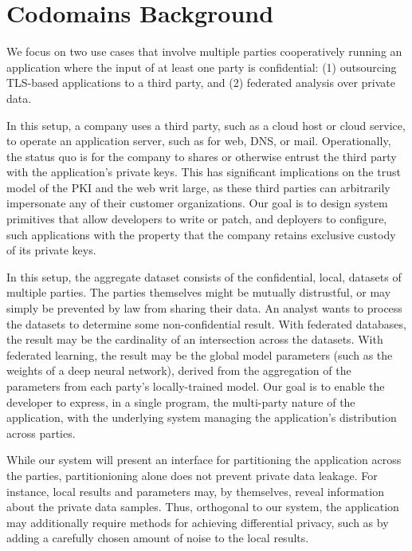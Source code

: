 \section{Codomains Background}
\label{sec:codomains-background}

We focus on two use cases that involve multiple parties cooperatively running
an application where the input of at least one party is confidential:
(1) outsourcing TLS-based applications to a third party, and (2) federated
analysis over private data.


%
In this setup, a company uses a third party, such as a cloud host or cloud
service, to operate an application server, such as for web, DNS, or mail.
%
Operationally, the status quo is for the company to shares or otherwise entrust
the third party with the application's private keys.
%
This has significant implications on the trust model of the PKI and the web
writ large, as these third parties can arbitrarily impersonate any of their
customer organizations.
%
Our goal is to design system primitives that allow developers to write or
patch, and deployers to configure, such applications with the property that the
company retains exclusive custody of its private keys.


%
In this setup,  the aggregate dataset consists of the confidential, local,
datasets of multiple parties.
% 
The parties themselves might be mutually distrustful, or may simply be
prevented by law from sharing their data.
%
An analyst wants to process the datasets to determine some non-confidential
result.
%
With federated databases, the result may be the cardinality of an intersection
across the datasets.
%
With federated learning, the result may be the global model parameters (such
as the weights of a deep neural network), derived from the aggregation of the
parameters from each party's locally-trained model.
%
Our goal is to enable the developer to express, in a
single program, the multi-party nature of the application, with the underlying
system managing the application's distribution across parties. 


While our system will present an interface for partitioning the application
across the parties, partitionioning alone does not prevent private data
leakage.
%
For instance, local results and parameters may, by themselves, reveal
information about the private data samples.
%
Thus, orthogonal to our system, the application may additionally require
methods for achieving differential privacy, such as by adding a carefully
chosen amount of noise to the local results.


